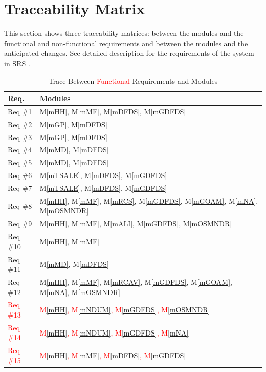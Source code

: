 \documentclass[12pt, titlepage]{article}
\newcommand{\mref}[1]{M\ref{#1}}
\begin{document}
\newpage
\section{Traceability Matrix} \label{SecTM}

This section shows three traceability matrices: between the modules and the
functional and non-functional requirements and between the modules and the anticipated changes. See detailed description for the requirements of the system in \href{https://github.com/paezha/PyERT-BLACK/blob/main/docs/SRS/SRS.pdf}{SRS} \citep{SRS}.

\begin{table}[H]
\centering
\begin{tabular}{p{} p{}}
\toprule
\textbf{Req.} & \textbf{Modules}\\
\midrule
Req \#1 & \mref{mHH}, \mref{mMF}, \mref{mDFDS}, \mref{mGDFDS}\\
Req \#2 & \mref{mGP}, \mref{mDFDS}\\
Req \#3 & \mref{mGP}, \mref{mDFDS}\\
Req \#4 & \mref{mMD}, \mref{mDFDS}\\
Req \#5 & \mref{mMD}, \mref{mDFDS}\\
Req \#6 & \mref{mTSALE}, \mref{mDFDS}, \mref{mGDFDS}\\
Req \#7 & \mref{mTSALE}, \mref{mDFDS}, \mref{mGDFDS}\\
Req \#8 & \mref{mHH}, \mref{mMF},  \mref{mRCS}, \mref{mGDFDS}, \mref{mGOAM}, \mref{mNA}, \mref{mOSMNDR}\\
Req \#9 & \mref{mHH}, \mref{mMF},  \mref{mALI}, \mref{mGDFDS}, \mref{mOSMNDR}\\
Req \#10 & \mref{mHH}, \mref{mMF}\\
Req \#11 & \mref{mMD}, \mref{mDFDS}\\
Req \#12 & \mref{mHH}, \mref{mMF},  \mref{mRCAV}, \mref{mGDFDS}, \mref{mGOAM}, \mref{mNA}, \mref{mOSMNDR}\\
\textcolor{red}{Req \#13} & \textcolor{red}{\mref{mHH}, \mref{mNDUM}, \mref{mGDFDS}, \mref{mOSMNDR}}\\
\textcolor{red}{Req \#14} & \textcolor{red}{\mref{mHH}, \mref{mNDUM}, \mref{mGDFDS}, \mref{mNA}}\\
\textcolor{red}{Req \#15} & \textcolor{red}{\mref{mHH}, \mref{mMF}, \mref{mDFDS}, \mref{mGDFDS}}\\

\bottomrule
\end{tabular}
\caption{Trace Between \textcolor{red}{Functional} Requirements and Modules}
\label{TblRT}
\end{table}
\end{document}
